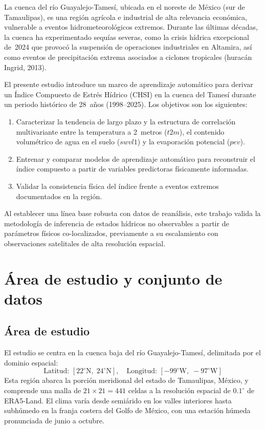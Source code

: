 \documentclass[12pt, a4paper]{article}
\begin{document}
La cuenca del río Guayalejo-Tamesí, ubicada en el noreste de México (sur de Tamaulipas), es una región agrícola e industrial de alta relevancia económica, vulnerable a eventos hidrometeorológicos extremos. Durante las últimas décadas, la cuenca ha experimentado sequías severas, como la crisis hídrica excepcional de~2024 que provocó la suspensión de operaciones industriales en Altamira, así como eventos de precipitación extrema asociados a ciclones tropicales (huracán Ingrid, 2013).

El presente estudio introduce un marco de aprendizaje automático para derivar un Índice Compuesto de Estrés Hídrico (CHSI) en la cuenca del Tamesí durante un periodo histórico de 28~años (1998--2025). Los objetivos son los siguientes:

\begin{enumerate}
    \item Caracterizar la tendencia de largo plazo y la estructura de correlación multivariante entre la temperatura a 2~metros ($t2m$), el contenido volumétrico de agua en el suelo ($swvl1$) y la evaporación potencial ($pev$).
    \item Entrenar y comparar modelos de aprendizaje automático para reconstruir el índice compuesto a partir de variables predictoras físicamente informadas.
    \item Validar la consistencia física del índice frente a eventos extremos documentados en la región.
\end{enumerate}

Al establecer una línea base robusta con datos de reanálisis, este trabajo valida la metodología de inferencia de estados hídricos no observables a partir de parámetros físicos co-localizados, previamente a su escalamiento con observaciones satelitales de alta resolución espacial.

\section{Área de estudio y conjunto de datos}
\label{sec:area_datos}

\subsection{Área de estudio}
\label{subsec:area}

El estudio se centra en la cuenca baja del río Guayalejo-Tamesí, delimitada por el dominio espacial:
%
\begin{equation}
    \text{Latitud: } [22^\circ\text{N},\; 24^\circ\text{N}], \quad \text{Longitud: } [-99^\circ\text{W},\; -97^\circ\text{W}]
    \label{eq:bbox}
\end{equation}
%
Esta región abarca la porción meridional del estado de Tamaulipas, México, y comprende una malla de $21 \times 21 = 441$ celdas a la resolución espacial de $0.1^\circ$ de ERA5-Land. El clima varía desde semiárido en los valles interiores hasta subhúmedo en la franja costera del Golfo de México, con una estación húmeda pronunciada de junio a octubre.
\end{document}
